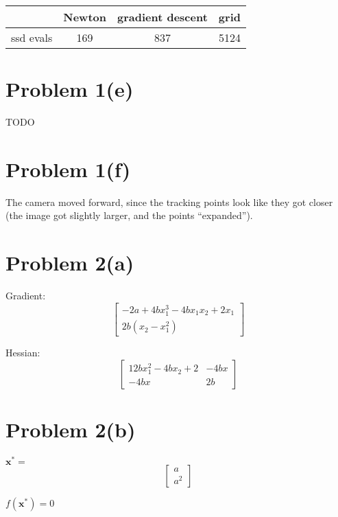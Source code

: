 \documentclass{article}
\begin{document}
\begin{center}
\begin{tabular}{ ||c|c|c|c|| } 
	\hline
				& Newton & gradient descent & grid \\ \hline
	ssd evals 	& 169 & 837 & 5124\\

\hline
\end{tabular}
\end{center}

\section*{Problem 1(e)}

TODO

\section*{Problem 1(f)}

The camera moved forward, since the tracking points look like they got closer (the image got slightly larger, and the points ``expanded'').

\section*{Problem 2(a)}

\begin{center}
Gradient:
\[
	\begin{bmatrix}
		-2a + 4bx_1^3 -4bx_1x_2 + 2x_1\\ 
		2b(x_2-x_1^2)
	\end{bmatrix}
\]

Hessian:
\[
	\begin{bmatrix}
		12bx_1^2-4bx_2+2 & -4bx\\
		-4bx & 2b 
	\end{bmatrix}
\]
\end{center}

\section*{Problem 2(b)}


$\mathbf{x^{*}} = $
\[
	\begin{bmatrix}
		a \\
		a^2
	\end{bmatrix}
\]

$f(\mathbf{x^{*}}) = 0$
	
\end{document}
